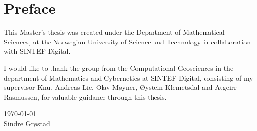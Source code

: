 {}
\chapter*{Preface}
This Master's thesis was created under the Department of Mathematical Sciences, at the Norwegian University of Science and Technology in collaboration with SINTEF Digital. 

I would like to thank the group from the Computational Geosciences in the department of Mathematics and Cybernetics at SINTEF Digital, consisting of my supervisor Knut-Andreas Lie, Olav Møyner, Øystein Klemetsdal and Atgeirr Rasmussen, for valuable guidance through this thesis.

\today \\
Sindre Grøstad